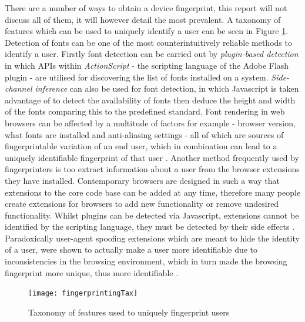\documentclass[12pt]{article}
\begin{document}
There are a number of ways to obtain a device fingerprint, this report will not discuss all of them, it will however detail the most prevalent. A taxonomy of features which can be used to uniquely identify a user can be seen in Figure \ref{fig:fingerprintingTax}. Detection of fonts can be one of the most counterintuitively reliable methods to identify a user. Firstly font detection can be carried out by \textit{plugin-based detection} in which APIs within \textit{ActionScript} - the scripting language of the Adobe Flash plugin - are utilised for discovering the list of fonts installed on a system. \textit{Side-channel inference} can also be used for font detection, in which Javascript is taken advantage of to detect the availability of fonts then deduce the height and width of the fonts comparing this to the predefined standard. Font rendering in web browsers can be affected by a multitude of factors for example - browser version, what fonts are installed and anti-aliasing settings - all of which are sources of fingerprintable variation of an end user, which in combination can lead to a uniquely identifiable fingerprint of that user \parencite{fingerprintFonts}. Another method frequently used by fingerprinters is too extract information about a user from the browser extensions they have installed. Contemporary browsers are designed in such a way that extensions to the core code base can be added at any time, therefore many people create extensions for browsers to add new functionality or remove undesired functionality. Whilst plugins can be detected via Javascript, extensions cannot be identified by the scripting language, they must be detected by their side effects \parencite{dustingFP}. Paradoxically user-agent spoofing extensions which are meant to hide the identity of a user, were shown to actually make a user more identifiable due to inconsistencies in the browsing environment, which in turn made the browsing fingerprint more unique, thus more identifiable  \parencite{cookielessMonster}. \\

\begin{figure}[H]
    \centering
    \texttt{[image: fingerprintingTax]}
    \caption{Taxonomy of features used to uniquely fingerprint users \parencite{cookielessMonster}}
    \label{fig:fingerprintingTax}
\end{figure}
\end{document}
